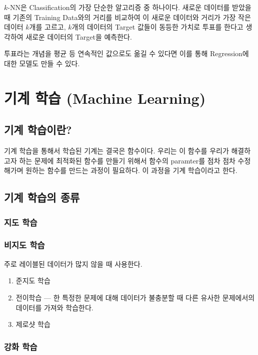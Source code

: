 \documentclass[]{sptr_article}
\begin{document}
$k$-NN은 Classification의 가장 단순한 알고리증 중 하나이다. 
새로운 데이터를 받았을 때 기존의 Training Data와의 거리를 비교하여 이 새로운 데이터와 거리가 가장 작은 데이터 $k$개를 고르고,
$k$개의 데이터의 Target 값들이 동등한 가치로 투표를 한다고 생각하여 새로운 데이터의 Target을 예측한다.

투표라는 개념을 평균 등 연속적인 값으로도 옮길 수 있다면 이를 통해 Regression에 대한 모델도 만들 수 있다.

\section{기계 학습 (Machine Learning)}

\subsection{기계 학습이란?}

기계 학습을 통해서 학습된 기계는 결국은 함수이다. 
우리는 이 함수를 우리가 해결하고자 하는 문제에 최적화된 함수를 만들기 위해서 함수의 paramter를 점차 점차 수정해가며 원하는 함수를 만드는 과정이 필요하다.
이 과정을 기계 학습이라고 한다.

\subsection{기계 학습의 종류}

\subsubsection{지도 학습}


\subsubsection{비지도 학습}

주로 레이블된 데이터가 많지 않을 때 사용한다.

\begin{enumerate}
  \item 준지도 학습
  \item 전이학습 --- 한 특정한 문제에 대해 데이터가 불충분할 때 다른 유사한 문제에서의 데이터를 가져와 학습한다.  
  \item 제로샷 학습
\end{enumerate}

\subsubsection{강화 학습}
\end{document}
